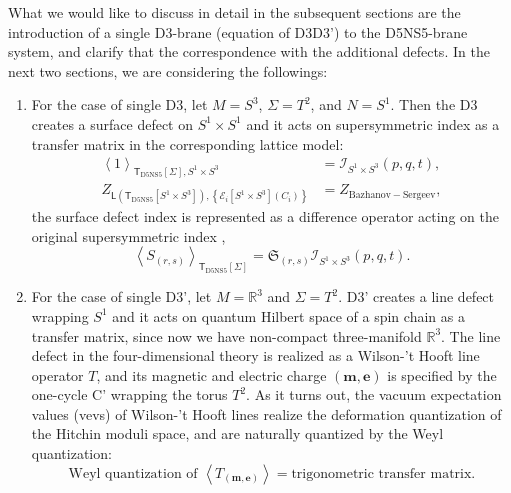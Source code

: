 What we would like to discuss in detail in the subsequent sections
are the introduction of a single D3-brane (equation of D3D3') to the
D5NS5-brane system, and clarify that the correspondence with the additional
defects. In the next two sections, we are considering the followings: 
\begin{enumerate}
	\item For the case of single D3, let $M=S^{3}$, $\Sigma=T^{2}$, and $N=S^{1}$.
Then the D3 creates a surface defect on $S^{1}\times S^{1}$ and it
acts on supersymmetric index as a transfer matrix in the corresponding
lattice model: 
\begin{align}
  \left\langle  1  \right\rangle_{\mathsf{T}_{\mathrm{D5NS5}}\left[\Sigma\right],S^{1}\times S^{3}}  
    &  =  \mathcal{I}_{S^{1}\times S^{3}}\left(p,q,t\right),\\
  Z_{\mathsf{L}\left(\mathsf{T}_{\mathrm{D5NS5}}\left[S^{1}\times S^{3}\right]\right),\left\{ \mathcal{E}_{i}\left[S^{1}\times S^{3}\right]\left(C_{i}\right)\right\} }  
    &  =  Z_{\mathrm{Bazhanov-Sergeev}},
\end{align}
 the surface defect index is represented as a difference operator
acting on the original supersymmetric index \cite{Gaiotto:2012xa,Gadde:2013dda}, 
\begin{equation}
  \left\langle S_{\left(r,s\right)}\right\rangle_{\mathsf{T}_{\mathrm{D5NS5}}\left[\Sigma\right]}  
  =  \mathfrak{S}_{\left(r,s\right)}\mathcal{I}_{S^{1}\times S^{3}}\left(p,q,t\right).
\end{equation}
\item For the case of single D3', let $M=\mathbb{R}^{3}$ and $\Sigma=T^{2}$.
D3' creates a line defect wrapping $S^{1}$ and it acts on quantum
Hilbert space of a spin chain as a transfer matrix, since now we have
non-compact three-manifold $\mathbb{R}^{3}$. The line defect in the
four-dimensional theory is realized as a Wilson-'t Hooft line operator
$T$, and its magnetic and electric charge $\left(\mathbf{m},\mathbf{e}\right)$
is specified by the one-cycle C' wrapping the torus $T^{2}$. As it
turns out, the vacuum expectation values (vevs) of Wilson-'t Hooft
lines realize the deformation quantization of the Hitchin moduli space,
and are naturally quantized by the Weyl quantization: 
\begin{equation}
  \textrm{Weyl quantization of }  \left\langle  T_{\left(\mathbf{m},\mathbf{e}\right)}  \right\rangle  
  =  \textrm{trigonometric transfer matrix.}
\end{equation}
\end{enumerate}
%



















